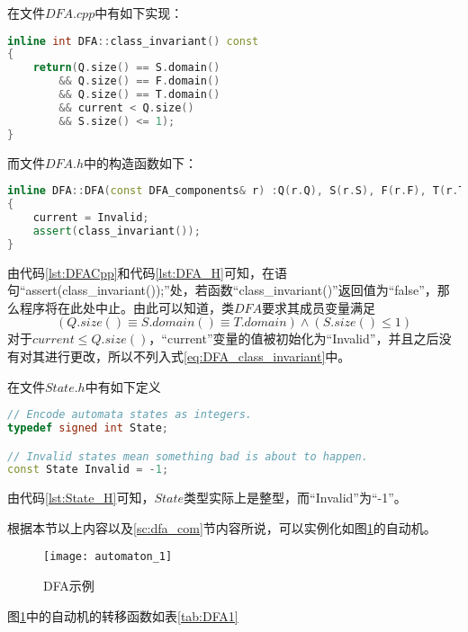 在文件$DFA.cpp$中有如下实现：
\lstset{style=mystyle}
\begin{lstlisting}[language=C++,label={lst:DFACpp},caption={DFA.cpp}]
inline int DFA::class_invariant() const
{
	return(Q.size() == S.domain()
		&& Q.size() == F.domain()
		&& Q.size() == T.domain()
		&& current < Q.size()
		&& S.size() <= 1);
}
\end{lstlisting}
而文件$DFA.h$中的构造函数如下：
\lstset{style=mystyle}
\begin{lstlisting}[language=C++,label={lst:DFA_H},caption={DFA.h}]
inline DFA::DFA(const DFA_components& r) :Q(r.Q), S(r.S), F(r.F), T(r.T)
{
	current = Invalid;
	assert(class_invariant());
}
\end{lstlisting}
由代码\ref{lst:DFACpp}和代码\ref{lst:DFA_H}可知，在语句“assert(class\_invariant());”处，若函数“class\_invariant()”返回值为“false”，那么程序将在此处中止\cite{assert_abort}。由此可以知道，类$DFA$要求其成员变量满足
\begin{equation}\label{eq:DFA_class_invariant}
    (Q.size() \equiv S.domain() \equiv T.domain ) \land (S.size() \leq 1)
\end{equation}
对于$current \le Q.size() $，“current”变量的值被初始化为“Invalid”，并且之后没有对其进行更改，所以不列入式\ref{eq:DFA_class_invariant}中。

在文件$State.h$中有如下定义
\lstset{style=mystyle}
\begin{lstlisting}[language=C++,label={lst:State_H},caption={State.h}]
// Encode automata states as integers.
typedef signed int State;

// Invalid states mean something bad is about to happen.
const State Invalid = -1;
\end{lstlisting}
由代码\ref{lst:State_H}可知，$State$类型实际上是整型，而“Invalid”为“-1”。

根据本节以上内容以及\ref{sc:dfa_com}节内容所说，可以实例化如图\ref{fig:DFA1}的自动机。

\begin{figure}[!htbp]
    \centering
    \texttt{[image: automaton\_1]}
    \caption{DFA示例}
    \label{fig:DFA1}
\end{figure}

图\ref{fig:DFA1}中的自动机的转移函数如表\ref{tab:DFA1}

